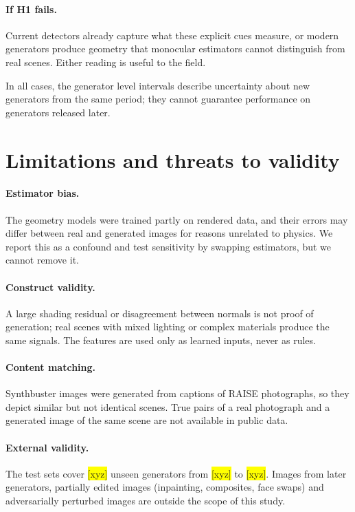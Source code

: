 \documentclass[11pt,a4paper]{article}
\newcommand{\xyz}[1][]{\colorbox{yellow}{[xyz]}}
\begin{document}
\paragraph{If H1 fails.} Current detectors already capture what these explicit cues measure, or modern generators produce geometry that monocular estimators cannot distinguish from real scenes. Either reading is useful to the field.

In all cases, the generator level intervals describe uncertainty about new generators from the same period; they cannot guarantee performance on generators released later.

\section{Limitations and threats to validity}
\label{sec:limits}

\paragraph{Estimator bias.} The geometry models were trained partly on rendered data, and their errors may differ between real and generated images for reasons unrelated to physics. We report this as a confound and test sensitivity by swapping estimators, but we cannot remove it.

\paragraph{Construct validity.} A large shading residual or disagreement between normals is not proof of generation; real scenes with mixed lighting or complex materials produce the same signals. The features are used only as learned inputs, never as rules.

\paragraph{Content matching.} Synthbuster images were generated from captions of RAISE photographs, so they depict similar but not identical scenes. True pairs of a real photograph and a generated image of the same scene are not available in public data.

\paragraph{External validity.} The test sets cover \xyz[ext.n_unseen_generators]{} unseen generators from \xyz[ext.earliest]{} to \xyz[ext.latest]. Images from later generators, partially edited images (inpainting, composites, face swaps) and adversarially perturbed images are outside the scope of this study.
\end{document}
